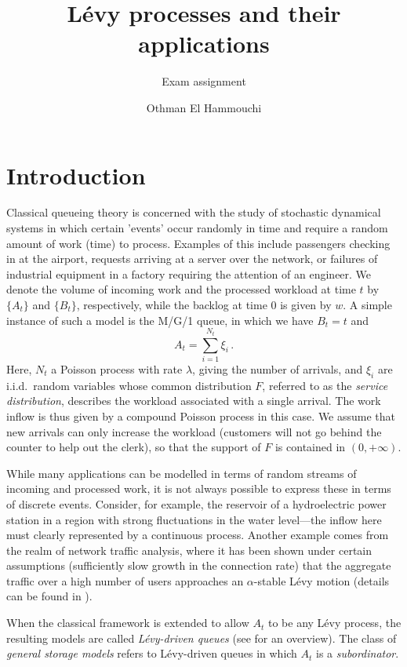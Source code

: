 \documentclass[titlepage]{article}
\author{Othman El Hammouchi}
\title{L\'evy processes and their applications}
\subtitle{Exam assignment}
\theoremstyle{plain}
\theoremstyle{definition}
\begin{document}
\maketitle

\section{Introduction} \label{sec:intro}

Classical queueing theory is concerned with the study of stochastic dynamical systems in which certain 'events' occur randomly in time and require a random amount of work (time) to process. Examples of this include passengers checking in at the airport, requests arriving at a server over the network, or failures of industrial equipment in a factory requiring the attention of an engineer. We denote the volume of incoming work and the processed workload at time $t$ by $\{ A_t \}$ and $\{ B_t \}$, respectively, while the backlog at time $0$ is given by $w$. A simple instance of such a model is the M/G/1 queue, in which we have $B_t = t$ and
\begin{equation}
  A_t = \sum_{i = 1}^{N_t} \xi_{i} \,.
\end{equation}
Here, $N_t$ a Poisson process with rate $\lambda$, giving the number of arrivals, and $\xi_i$ are i.i.d.\ random variables whose common distribution $F$, referred to as the \emph{service distribution}, describes the workload associated with a single arrival. The work inflow is thus given by a compound Poisson process in this case. We assume that new arrivals can only increase the workload (customers will not go behind the counter to help out the clerk), so that the support of $F$ is contained in $(0, +\infty)$.

While many applications can be modelled in terms of random streams of incoming and processed work, it is not always possible to express these in terms of discrete events. Consider, for example, the reservoir of a hydroelectric power station in a region with strong fluctuations in the water level---the inflow here must clearly represented by a continuous process. Another example comes from the realm of network traffic analysis, where it has been shown under certain assumptions (sufficiently slow growth in the connection rate) that the aggregate traffic over a high number of users approaches an $\alpha$-stable L\'evy motion (details can be found in \cite{mikosch}).

When the classical framework is extended to allow $A_t$ to be any L\'evy process, the resulting models are called \emph{L\'evy-driven queues} (see \cite{debicki} for an overview). The class of \emph{general storage models} refers to L\'evy-driven queues in which $A_t$ is a \emph{subordinator}.
\end{document}
